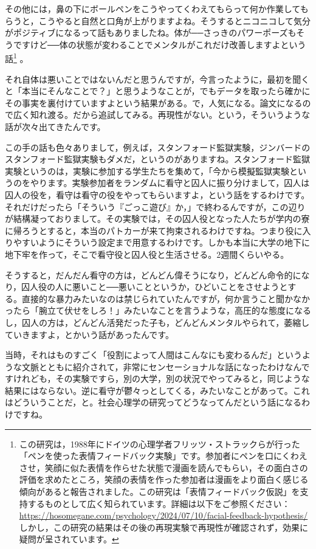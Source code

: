 \documentclass{ltjsbook}
\begin{document}
その他には，鼻の下にボールペンをこうやってくわえてもらって何か作業してもらうと，こうやると自然と口角が上がりますよね。そうするとニコニコして気分がポジティブになるって話もありましたね。体が──さっきのパワーポーズもそうですけど──体の状態が変わることでメンタルがこれだけ改善しますよという話\footnote{この研究は，1988年にドイツの心理学者フリッツ・ストラックらが行った「ペンを使った表情フィードバック実験」です。参加者にペンを口にくわえさせ，笑顔に似た表情を作らせた状態で漫画を読んでもらい，その面白さの評価を求めたところ，笑顔の表情を作った参加者は漫画をより面白く感じる傾向があると報告されました。この研究は「表情フィードバック仮説」を支持するものとして広く知られています。詳細は以下をご参照ください：\url{https://hosomegane.com/psychology/2024/07/10/facial-feedback-hypothesis/}しかし，この研究の結果はその後の再現実験で再現性が確認されず，効果に疑問が呈されています。} 。

それ自体は悪いことではないんだと思うんですが，今言ったように，最初を聞くと「本当にそんなことで？」と思うようなことが，でもデータを取ったら確かにその事実を裏付けていますよという結果がある。で，人気になる。論文になるので広く知れ渡る。だから追試してみる。再現性がない。という，そういうような話が次々出てきたんです。

この手の話も色々ありまして，例えば，スタンフォード監獄実験，ジンバードのスタンフォード監獄実験もダメだ，というのがありますね。スタンフォード監獄実験というのは，実験に参加する学生たちを集めて，「今から模擬監獄実験というのをやります。実験参加者をランダムに看守と囚人に振り分けまして，囚人は囚人の役を，看守は看守の役をやってもらいますよ，という話をするわけです。それだけだったら「そういう『ごっこ遊び』か，」で終わるんですが，この辺りが結構凝っておりまして。その実験では，その囚人役となった人たちが学内の寮に帰ろうとすると，本当のパトカーが来て拘束されるわけですね。つまり役に入りやすいようにそういう設定まで用意するわけです。しかも本当に大学の地下に地下牢を作って，そこで看守役と囚人役と生活させる。2週間くらいやる。

そうすると，だんだん看守の方は，どんどん偉そうになり，どんどん命令的になり，囚人役の人に悪いこと──悪いことというか，ひどいことをさせようとする。直接的な暴力みたいなのは禁じられていたんですが，何か言うこと聞かなかったら「腕立て伏せをしろ！」みたいなことを言うような，高圧的な態度になるし，囚人の方は，どんどん活発だった子も，どんどんメンタルやられて，萎縮していきますよ，とかいう話があったんです。

当時，それはものすごく「役割によって人間はこんなにも変わるんだ」というような文脈とともに紹介されて，非常にセンセーショナルな話になったわけなんですけれども，その実験ですら，別の大学，別の状況でやってみると，同じような結果にはならない。逆に看守が鬱々っとしてくる，みたいなことがあって\parencite{Reicher2006}。これはどういうことだ，と。社会心理学の研究ってどうなってんだという話になるわけですね。
\end{document}
